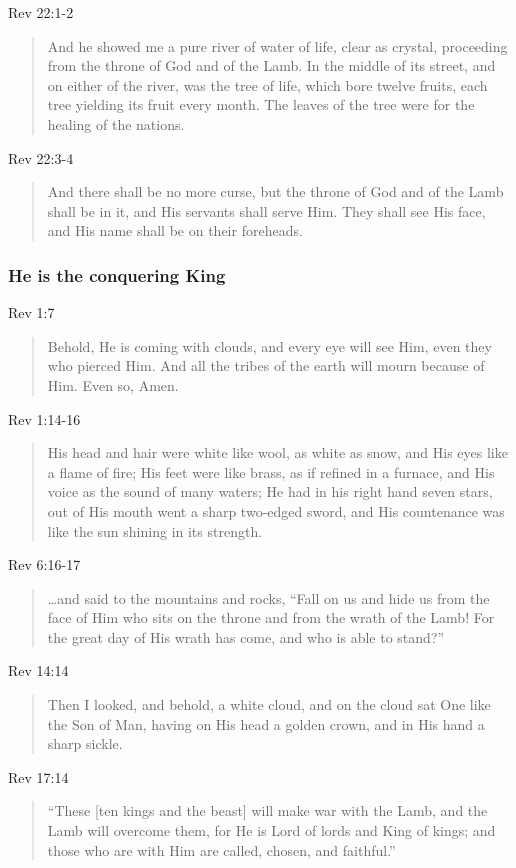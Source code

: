 \documentclass{article}
\newcommand{\I}{\item}
\newcommand{\Q}[1]{\begin{quote} #1 \end{quote}}
\begin{document}
\I Rev 22:1-2 \Q{And he showed me a pure river of water of life, 
                clear as crystal, proceeding from the throne of God 
                and of the Lamb. In the middle of its street, and on either
                of the river, was the tree of life, which bore twelve fruits,
                each tree yielding its fruit every month. 
                The leaves of the tree were for the healing of the nations.}
\I Rev 22:3-4 \Q{And there shall be no more curse, but the throne of God
                and of the Lamb shall be in it, and His servants shall 
                serve Him. They shall see His face, and His name shall be on
                their foreheads.}
                    
\subsubsection{He is the conquering King}
\I Rev 1:7 \Q{Behold, He is coming with clouds, and every eye will see Him, 
                even they who pierced Him. And all the tribes of the earth
                will mourn because of Him. Even so, Amen.}
\I Rev 1:14-16 \Q{His head and hair were white like wool, as white as snow,
                and His eyes like a flame of fire; His feet were like brass, 
                as if refined in a furnace, and His voice as the sound of 
                many waters; He had in his right hand seven stars, 
                out of His mouth went a sharp two-edged sword, 
                and His countenance was like the sun shining in its strength.}
\I Rev 6:16-17 \Q{\ldots and said to the mountains and rocks, 
                ``Fall on us and hide us from the face of Him who sits on the
                throne and from the wrath of the Lamb! For the great day of His
                wrath has come, and who is able to stand?''}
\I Rev 14:14 \Q{Then I looked, and behold, a white cloud, and on the cloud
                sat One like the Son of Man, having on His head a golden crown, 
                and in His hand a sharp sickle.}
\I Rev 17:14 \Q{``These [ten kings and the beast] will make war with the Lamb, 
                and the Lamb will overcome them, for He is Lord of lords and
                King of kings; and those who are with Him are called, 
                chosen, and faithful.''}
\end{document}
